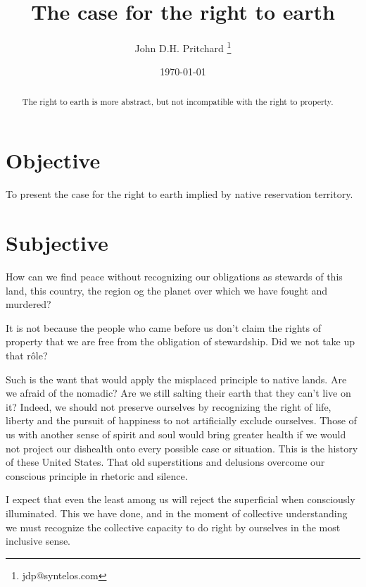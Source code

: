 \documentclass{article}
\begin{document}
\title{The case for the right to earth}

\author{John D.H. Pritchard \thanks{jdp@syntelos.com}}

\date{\today}

\maketitle

\begin{abstract}
The right to earth is more abstract, but not incompatible with the
right to property.  
\end{abstract}


\section{Objective}

To present the case for the right to earth implied by native
reservation territory.

\section{Subjective}

How can we find peace without recognizing our obligations as stewards
of this land, this country, the region og the planet over which we
have fought and murdered?  

It is not because the people who came before us don't claim the rights
of property that we are free from the obligation of stewardship.  Did
we not take up that r\^ole?

Such is the want that would apply the misplaced principle to native
lands.  Are we afraid of the nomadic?  Are we still salting their
earth that they can't live on it?  Indeed, we should not preserve
ourselves by recognizing the right of life, liberty and the pursuit of
happiness to not artificially exclude ourselves.  Those of us with
another sense of spirit and soul would bring greater health if we
would not project our dishealth onto every possible case or situation.
This is the history of these United States.  That old superstitions
and delusions overcome our conscious principle in rhetoric and
silence.

I expect that even the least among us will reject the superficial when
consciously illuminated.  This we have done, and in the moment of
collective understanding we must recognize the collective capacity to
do right by ourselves in the most inclusive sense.
\end{document}
